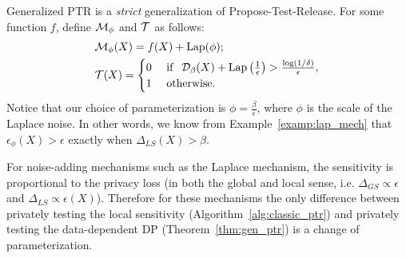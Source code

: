 


Generalized PTR is a \emph{strict} generalization of Propose-Test-Release. For some function $f$, define  $\mathcal{M}_{\phi}$ and $\mathcal{T}$ as follows:
\begin{align*}
&\mathcal{M}_{\phi}(X) = f(X) + \text{Lap}(\phi); \\
&\mathcal{T}(X) = 
\begin{cases}
0 & \text{ if\:\: } \mathcal{D}_{\beta}(X) + \text{Lap}\left(\frac{1}{\epsilon}\right) > \frac{\log(1/\delta)}{\epsilon},\\
1 & \text{ otherwise.} \\
\end{cases}
\end{align*}
Notice that our choice of parameterization is $\phi = \frac{\beta}{\epsilon}$, where $\phi$ is the scale of the Laplace noise. In other words, we know from Example~\ref{examp:lap_mech} that $\epsilon_{\phi}(X) > \epsilon$ exactly when $\Delta_{LS}(X) > \beta$.

For noise-adding mechanisms such as the Laplace mechanism, the sensitivity is proportional to the privacy loss (in both the global and local sense, i.e. $\Delta_{GS} \propto \epsilon$ and $\Delta_{LS} \propto \epsilon(X)$). Therefore for these mechanisms the only difference between privately testing the local sensitivity (Algorithm~\ref{alg:classic_ptr}) and privately testing the data-dependent DP (Theorem~\ref{thm:gen_ptr}) is a change of parameterization.
